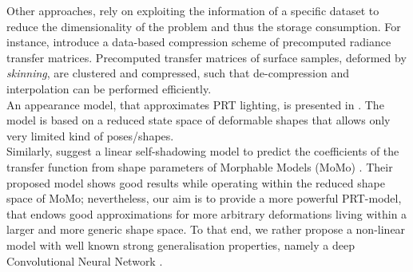 Other approaches, rely on exploiting the information of a specific dataset to reduce the dimensionality of the problem and thus the storage consumption. For instance, \cite{SkinningPRT} introduce a data-based compression scheme of precomputed radiance transfer matrices. Precomputed transfer matrices of surface samples, deformed by \textit{skinning}, are clustered and compressed, such that de-compression and interpolation can be performed efficiently.
\\  
An appearance model, that approximates PRT lighting, is presented in  \cite{James_Fatahalian}. The model is based on a reduced state space of deformable shapes that allows only very limited kind of poses/shapes. 
\\
Similarly, \cite{MoMoPRT} suggest a linear self-shadowing model to predict the coefficients of the transfer function from shape parameters of Morphable Models (MoMo) \cite{MoMo}. Their proposed model shows good results while operating within the reduced shape space of MoMo; nevertheless, our aim is to provide a more powerful PRT-model, that endows good approximations for more arbitrary deformations living within a larger and more generic shape space. To that end, we rather propose a non-linear model with well known strong generalisation properties, namely a deep Convolutional Neural Network \cite{DL_nature, ImageNet_CNN, CNN_videoClassification}.  
